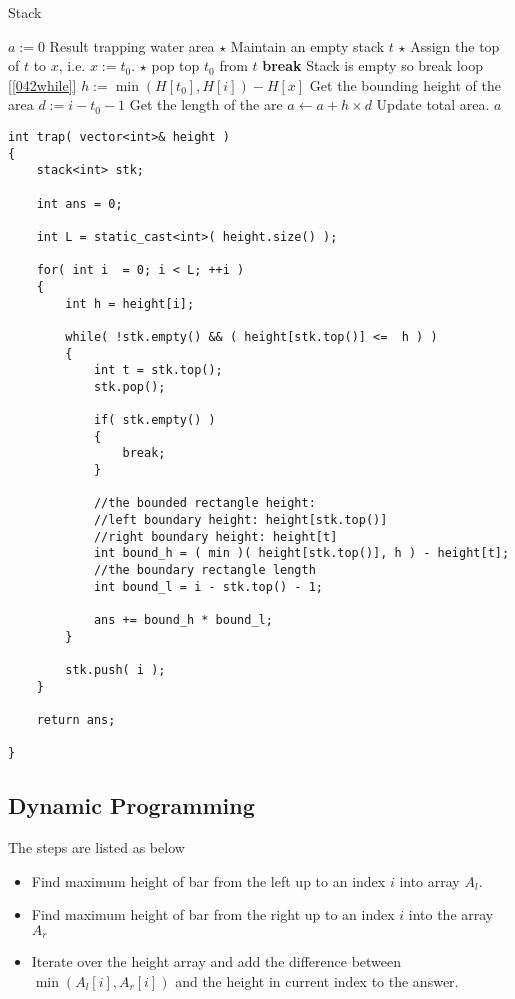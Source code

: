 \setcounter{algorithm}{0}
\begin{algorithm}[H]
\caption{Stack}
\begin{algorithmic}[1]
\State $a:= 0$ \Comment Result trapping water area
\State $\star$ Maintain an empty stack $t$
 \label{042while}
\State $\star$ Assign the top of $t$ to $x$, i.e. $x:=t_0$. 
\State $\star$ pop top $t_0$ from $t$
\State \textbf{break} \Comment Stack is empty so break loop [\ref{042while}]
\Else
\State $h := \min(H[t_0], H[i]) - H[x]$ \Comment Get the bounding height of the area
\State $d := i - t_0 - 1$ \Comment Get the length of the are
\State $a \gets a + h\times d$ \Comment Update total area.
\EndIf
\EndWhile
\EndFor
\State \Return $a$
\EndProcedure
\end{algorithmic}
\end{algorithm}

\setcounter{lstlisting}{0}
\begin{lstlisting}[style=customc, caption={Stack}]
int trap( vector<int>& height )
{
    stack<int> stk;

    int ans = 0;

    int L = static_cast<int>( height.size() );

    for( int i  = 0; i < L; ++i )
    {
        int h = height[i];

        while( !stk.empty() && ( height[stk.top()] <=  h ) )
        {
            int t = stk.top();
            stk.pop();

            if( stk.empty() )
            {
                break;
            }

            //the bounded rectangle height:
            //left boundary height: height[stk.top()]
            //right boundary height: height[t]
            int bound_h = ( min )( height[stk.top()], h ) - height[t];
            //the boundary rectangle length
            int bound_l = i - stk.top() - 1;

            ans += bound_h * bound_l;
        }

        stk.push( i );
    }

    return ans;

}
\end{lstlisting}

\subsection{Dynamic Programming}
The steps are listed as below
\begin{itemize}
\item Find maximum height of bar from the left up to an index $i$ into array $A_l$.
\item Find maximum height of bar from the right up to an index $i$ into the array $A_r$
\item Iterate over the height array and add the difference between $\min(A_l[i], A_r[i])$ and the height in current index to the answer.
\end{itemize}

